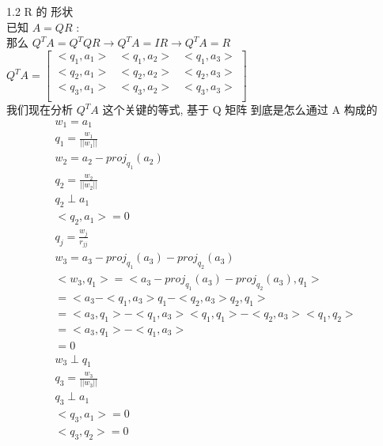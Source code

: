 \documentclass[12pt]{article}
\begin{document}
\begin{flushleft}
    1.2 R 的 形状 \\
    已知 $A = QR$ : \\
    那么 $Q^{T}A = Q^{T}QR \to Q^{T}A = IR  \to  Q^{T}A = R$
    $Q^{T}A = \begin{bmatrix}
            <q_{1},a_{1}> & <q_{1},a_{2}> & <q_{1},a_{3}> \\
            <q_{2},a_{1}> & <q_{2},a_{2}> & <q_{2},a_{3}> \\
            <q_{3},a_{1}> & <q_{3},a_{2}> & <q_{3},a_{3}> \\
        \end{bmatrix}$ \\
    我们现在分析 $Q^{T}A$ 这个关键的等式, 基于 Q 矩阵 到底是怎么通过 A 构成的 \\
    \begin{align}
        w_{1} = a_{1}                                                                \\
        q_{1} = \frac{w_{1}}{||w_{1}||}                                              \\
        w_{2} = a_{2} - proj_{q_{1}}(a_{2})                                          \\
        q_{2} = \frac{w_{2}}{||w_{2}||}                                              \\
        q_{2} \perp a_{1}                                                            \\
        <q_{2}, a_{1}> = 0                                                           \\
        q_{j} = \frac{w_{j}}{r_{jj}}                                                 \\
        w_{3} = a_{3} - proj_{q_{1}}(a_{3}) - proj_{q_{2}}(a_{3})                    \\
        <w_{3}, q_{1}> = <a_{3} - proj_{q_{1}}(a_{3}) - proj_{q_{2}}(a_{3}), q_{1}>  \\
        = <a_{3} - <q_{1},a_{3}>q_{1} - <q_{2},a_{3}>q_{2}, q_{1}>                   \\
        = <a_{3}, q_{1}> - <q_{1}, a_{3}><q_{1}, q_{1}> - <q_{2},a_{3}><q_{1},q_{2}> \\
        = <a_{3}, q_{1}> - <q_{1}, a_{3}>                                            \\
        = 0                                                                          \\
        w_{3} \perp q_{1}                                                            \\
        q_{3} = \frac{w_{3}}{||w_{3}||}                                              \\
        q_{3} \perp a_{1}                                                            \\
        <q_{3}, a_{1}> = 0                                                           \\
        <q_{3}, q_{2}> = 0                                                           \\
    \end{align}


\end{flushleft}
\end{document}
